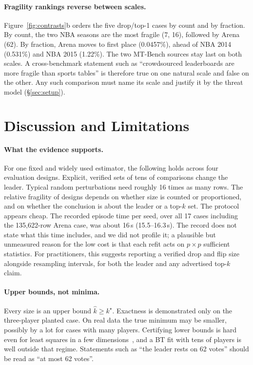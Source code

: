 \documentclass{article}
\newcommand{\kver}{\hat{k}}
\begin{document}
\paragraph{Fragility rankings reverse between scales.}
Figure~\ref{fig:contrasts}b orders the five drop/top-1 cases by count and by fraction. By count, the two NBA seasons are the most fragile (7, 16), followed by Arena (62). By fraction, Arena moves to first place (0.0457\%), ahead of NBA 2014 (0.531\%) and NBA 2015 (1.22\%). The two MT-Bench sources stay last on both scales. A cross-benchmark statement such as ``crowdsourced leaderboards are more fragile than sports tables'' is therefore true on one natural scale and false on the other. Any such comparison must name its scale and justify it by the threat model (\S\ref{sec:setup}).

\section{Discussion and Limitations}
\label{sec:limitations}

\paragraph{What the evidence supports.}
For one fixed and widely used estimator, the following holds across four evaluation designs. Explicit, verified sets of tens of comparisons change the leader. Typical random perturbations need roughly 16 times as many rows. The relative fragility of designs depends on whether size is counted or proportioned, and on whether the conclusion is about the leader or a top-$k$ set. The protocol appears cheap. The recorded episode time per seed, over all 17 cases including the 135,622-row Arena case, was about 16\,s (15.5--16.3\,s). The record does not state what this time includes, and we did not profile it; a plausible but unmeasured reason for the low cost is that each refit acts on $p\times p$ sufficient statistics. For practitioners, this suggests reporting a verified drop and flip size alongside resampling intervals, for both the leader and any advertised top-$k$ claim.

\paragraph{Upper bounds, not minima.}
Every size is an upper bound $\kver\ge k^\star$. Exactness is demonstrated only on the three-player planted case. On real data the true minimum may be smaller, possibly by a lot for cases with many players. Certifying lower bounds is hard even for least squares in a few dimensions~\citep{Moitra2022ProvablyAO,Freund2023TowardsPR}, and a BT fit with tens of players is well outside that regime. Statements such as ``the leader rests on 62 votes'' should be read as ``at most 62 votes''.
\end{document}
